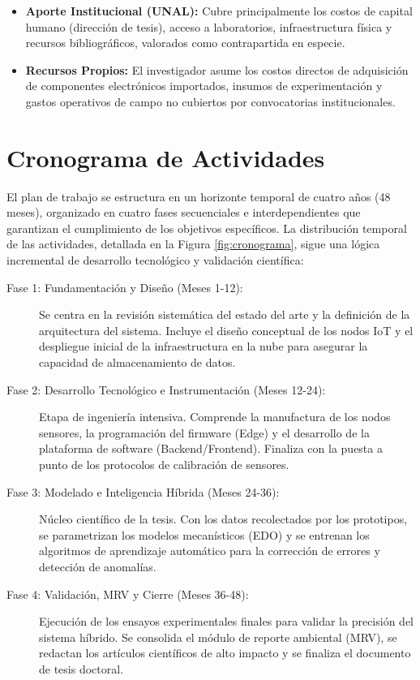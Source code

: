 \begin{itemize}
    \item \textbf{Aporte Institucional (UNAL):} Cubre principalmente los costos de capital humano (dirección de tesis), acceso a laboratorios, infraestructura física y recursos bibliográficos, valorados como contrapartida en especie.
    \item \textbf{Recursos Propios:} El investigador asume los costos directos de adquisición de componentes electrónicos importados, insumos de experimentación y gastos operativos de campo no cubiertos por convocatorias institucionales.
\end{itemize}
\section{Cronograma de Actividades}

El plan de trabajo se estructura en un horizonte temporal de cuatro años (48 meses), organizado en cuatro fases secuenciales e interdependientes que garantizan el cumplimiento de los objetivos específicos. La distribución temporal de las actividades, detallada en la Figura \ref{fig:cronograma}, sigue una lógica incremental de desarrollo tecnológico y validación científica:

\begin{description}
    \item[Fase 1: Fundamentación y Diseño (Meses 1-12):] 
    Se centra en la revisión sistemática del estado del arte y la definición de la arquitectura del sistema. Incluye el diseño conceptual de los nodos IoT y el despliegue inicial de la infraestructura en la nube para asegurar la capacidad de almacenamiento de datos.
    
    \item[Fase 2: Desarrollo Tecnológico e Instrumentación (Meses 12-24):] 
    Etapa de ingeniería intensiva. Comprende la manufactura de los nodos sensores, la programación del firmware (Edge) y el desarrollo de la plataforma de software (Backend/Frontend). Finaliza con la puesta a punto de los protocolos de calibración de sensores.
    
    \item[Fase 3: Modelado e Inteligencia Híbrida (Meses 24-36):] 
    Núcleo científico de la tesis. Con los datos recolectados por los prototipos, se parametrizan los modelos mecanísticos (EDO) y se entrenan los algoritmos de aprendizaje automático para la corrección de errores y detección de anomalías.
    
    \item[Fase 4: Validación, MRV y Cierre (Meses 36-48):] 
    Ejecución de los ensayos experimentales finales para validar la precisión del sistema híbrido. Se consolida el módulo de reporte ambiental (MRV), se redactan los artículos científicos de alto impacto y se finaliza el documento de tesis doctoral.
\end{description}

